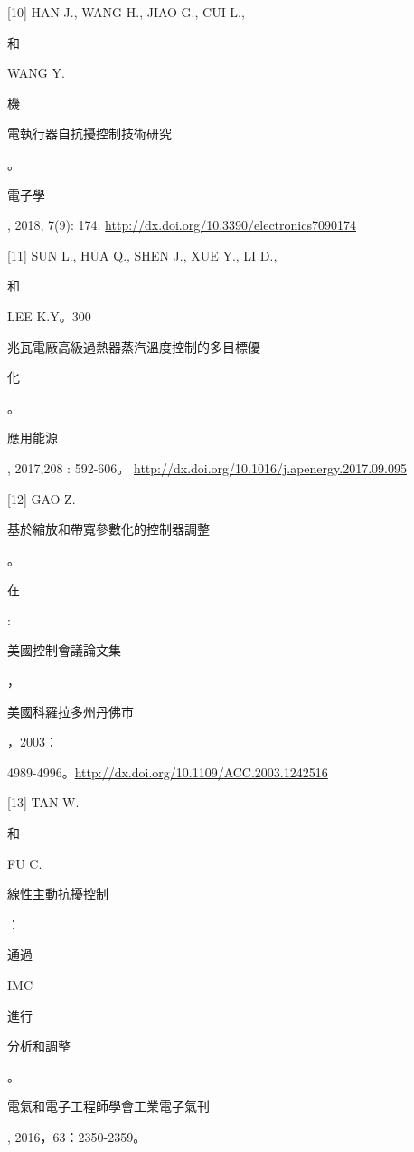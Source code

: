 \documentclass[10pt]{article}
\begin{document}
[10] HAN J., WANG H., JIAO G., CUI L., \begin{CJK}{UTF8}{mj}和\end{CJK} WANG Y. \begin{CJK}{UTF8}{mj}機\end{CJK} \begin{CJK}{UTF8}{mj}電執行器自抗擾控制技術研究\end{CJK}。\begin{CJK}{UTF8}{mj}電子學\end{CJK}, 2018, 7(9): 174. \href{http://dx.doi.org/10.3390/electronics7090174}{http://dx.doi.org/10.3390/electronics7090174}

[11] SUN L., HUA Q., SHEN J., XUE Y., LI D., \begin{CJK}{UTF8}{mj}和\end{CJK} LEE K.Y。300\begin{CJK}{UTF8}{mj}兆瓦電廠高級過熱器蒸汽溫度控制的多目標優\end{CJK} \begin{CJK}{UTF8}{mj}化\end{CJK}。\begin{CJK}{UTF8}{mj}應用能源\end{CJK}, 2017,208 : 592-606。 \href{http://dx.doi.org/10.1016/j.apenergy.2017.09.095}{http://dx.doi.org/10.1016/j.apenergy.2017.09.095}

[12] GAO Z. \begin{CJK}{UTF8}{mj}基於縮放和帶寬參數化的控制器調整\end{CJK}。\begin{CJK}{UTF8}{mj}在\end{CJK} : \begin{CJK}{UTF8}{mj}美國控制會議論文集\end{CJK}，\begin{CJK}{UTF8}{mj}美國科羅拉多州丹佛市\end{CJK}，2003：

4989-4996。\href{http://dx.doi.org/10.1109/ACC.2003.1242516}{http://dx.doi.org/10.1109/ACC.2003.1242516}

[13] TAN W. \begin{CJK}{UTF8}{mj}和\end{CJK} FU C. \begin{CJK}{UTF8}{mj}線性主動抗擾控制\end{CJK}：\begin{CJK}{UTF8}{mj}通過\end{CJK}IMC\begin{CJK}{UTF8}{mj}進行\end{CJK} \begin{CJK}{UTF8}{mj}分析和調整\end{CJK}。\begin{CJK}{UTF8}{mj}電氣和電子工程師學會工業電子氣刊\end{CJK}, 2016，63：2350-2359。
\end{document}
